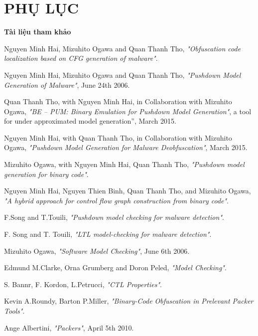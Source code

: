 
\newpage
\chapter{PHỤ LỤC}

\begin{Large}
\textbf{Tài liệu tham khảo}
\end{Large}

\begin{thebibliography}{}

\bibitem{}
Nguyen Minh Hai, Mizuhito Ogawa and Quan Thanh Tho, \emph{"Obfuscation code localization based on CFG generation of malware"}.

\bibitem{}
Nguyen Minh Hai, Mizuhito Ogawa and Quan Thanh Tho, \emph{"Pushdown Model Generation of Malware"}, June 24th 2006.

\bibitem{}
Quan Thanh Tho, with Nguyen Minh Hai, in Collaboration with Mizuhito Ogawa, \emph{"BE – PUM: Binary Emulation for Pushdown Model Generation"}, a tool for under approximated model generation”, March 2015.	

\bibitem{}
Nguyen Minh Hai, with Quan Thanh Tho, in Collaboration with Mizuhito Ogawa, \emph{"Pushdown Model Generation for Malware Deobfuscation"}, March 2015.

\bibitem{}
Mizuhito Ogawa, with Nguyen Minh Hai, Quan Thanh Tho, \emph{"Pushdown model generation for binary code"}.

\bibitem{}
Nguyen Minh Hai, Nguyen Thien Binh, Quan Thanh Tho, and Mizuhito Ogawa, \emph{"A hybrid approach for control flow graph construction from binary code"}.

\bibitem{}
F.Song and T.Touili, \emph{"Pushdown model checking for malware detection"}.

\bibitem{}
F. Song and T. Touili, \emph{"LTL model-checking for malware detection"}.

\bibitem{}
Mizuhito Ogawa, \emph{"Software Model Checking"}, June 6th 2006.

\bibitem{}
Edmund M.Clarke, Orna Grumberg and Doron Peled, \emph{"Model Checking"}.

\bibitem{}
S. Bannr, F. Kordon, L.Petrucci, \emph{"CTL Properties"}.

\bibitem{}
Kevin A.Roundy, Barton P.Miller, \emph{"Binary-Code Obfuscation in Prelevant Packer Tools"}.

\bibitem{}
Ange Albertini, \emph{"Packers"}, April 5th 2010.


\end{thebibliography}
